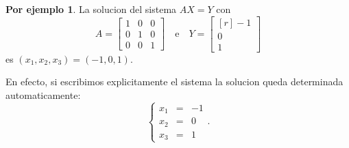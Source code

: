 \documentclass{article}
\theoremstyle{definition}
\theoremstyle{definition}
\newtheorem*{ej}{Por ejemplo}
\theoremstyle{remark}
\begin{document}
\begin{ej}
  La solucion del sistema $AX=Y$ con \[
    A=\begin{bmatrix} 1 & 0 & 0 \\ 0 & 1 & 0 \\ 0 & 0 & 1 \end{bmatrix} \quad  \text{e} \quad Y=\begin{bmatrix}[r] -1 \\ 0 \\ 1 \end{bmatrix}
  \]
  es $(x_1,x_2,x_3)=(-1,0,1)$.
\end{ej}
En efecto, si escribimos explicitamente el sistema la solucion queda determinada automaticamente: \[
  \left\{ \begin{array}{llr}x_1 & = & -1 \\ x_2 & = & 0 \\ x_3 & = & 1 \end{array}\right. .
\] \pagebreak
\end{document}
